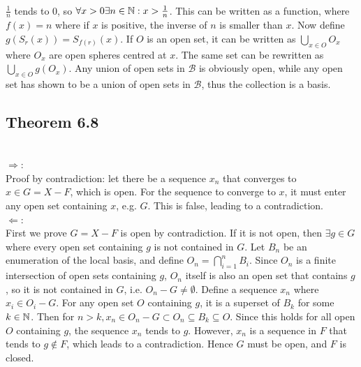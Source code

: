 \begin{solution}
 \\$\frac{1}{n}$ tends to 0, so $\forall x > 0 \exists n \in \mathbb{N}: x > \frac{1}{n}$. This can be written as a function, where $f(x) = n$ where if $x$ is positive, the inverse of $n$ is smaller than $x$. Now define $g(S_r(x)) = S_{f(r)}(x)$. If $O$ is an open set, it can be written as $\bigcup_{x \in O} O_x$ where $O_x$ are open spheres centred at $x$. The same set can be rewritten as $\bigcup_{x \in O} g(O_x)$. Any union of open sets in $\mathcal{B}$ is obviously open, while any open set has shown to be a union of open sets in $\mathcal{B}$, thus the collection is a basis.
\end{solution}

\subsection{Theorem 6.8}
\setcounter{question}{0}


\begin{solution}
 \\$\Rightarrow$: \\
 Proof by contradiction: let there be a sequence $x_n$ that converges to $x \in G = X - F$, which is open. For the sequence to converge to $x$, it must enter any open set containing $x$, e.g. $G$. This is false, leading to a contradiction. \\
 $\Leftarrow$: \\
 First we prove $G = X - F$ is open by contradiction. If it is not open, then $\exists g \in G$ where every open set containing $g$ is not contained in $G$. Let $B_n$ be an enumeration of the local basis, and define $O_n = \bigcap_{i=1}^n B_i$. Since $O_n$ is a finite intersection of open sets containing $g$, $O_n$ itself is also an open set that contains $g$, so it is not contained in $G$, i.e. $O_n - G \neq \emptyset$. Define a sequence $x_n$ where $x_i \in O_i - G$. For any open set $O$ containing $g$, it is a superset of $B_k$ for some $k \in \mathbb{N}$. Then for $n > k, x_n \in O_n - G \subset O_n \subseteq B_k \subseteq O$. Since this holds for all open $O$ containing $g$, the sequence $x_n$ tends to $g$. However, $x_n$ is a sequence in $F$ that tends to $g \notin F$, which leads to a contradiction. Hence $G$ must be open, and $F$ is closed.
\end{solution}

